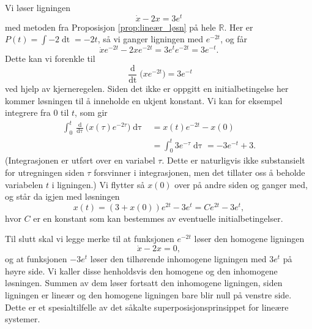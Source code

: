 \documentclass{article}
\theoremstyle{plain}
\theoremstyle{definition}
\theoremstyle{remark}
\newenvironment{ex}
{\pushQED{\qed}\renewcommand{\qedsymbol}{$\triangle$}\exx}
{\popQED\endexx}
\newcommand{\diff}[1]{\mathop{d#1}}
\newcommand{\fcn}{x}
\newcommand{\expfcn}[1]{e^{#1}}
\newcommand{\bigparanth}[1]{\big(#1\big)}
\begin{document}
\begin{ex} \label{eks:grundig_lineær}
    Vi løser ligningen
    \begin{equation*}
        \dot{\fcn} - 2\fcn = 3\expfcn{t}
    \end{equation*}
    med metoden fra Proposisjon \ref{prop:lineær_løsn} på hele $\mathbb{R}$. Her er $P(t) = \int -2 \diff{t} = -2t$, så vi ganger ligningen med $\expfcn{-2t}$, og får
    \begin{equation*}
        \dot{\fcn} \expfcn{-2t} - 2\fcn \expfcn{-2t} = 3\expfcn{t} \expfcn{-2t} = 3 \expfcn{-t}.
    \end{equation*}
    Dette kan vi forenkle til
    \begin{equation*}
        \frac{\diff{}}{\diff{t}} \bigparanth{\fcn \expfcn{-2t}} = 3 \expfcn{-t}
    \end{equation*}
    ved hjelp av kjerneregelen. Siden det ikke er oppgitt en initialbetingelse her kommer løsningen til å inneholde en ukjent konstant. Vi kan for eksempel integrere fra $0$ til $t$, som gir
    \begin{equation*}
        \begin{aligned}
            \int_0^t \frac{\diff{}}{\diff{\tau}} \bigparanth{\fcn(\tau) \expfcn{-2\tau}} \diff{\tau} & = \fcn(t)\expfcn{-2t} - \fcn(0)                             \\
                                                                                                     & = \int_0^t 3\expfcn{-\tau} \diff{\tau} = -3\expfcn{-t} + 3.
        \end{aligned}
    \end{equation*}
    (Integrasjonen er utført over en variabel $\tau$. Dette er naturligvis ikke substansielt for utregningen siden $\tau$ forsvinner i integrasjonen, men det tillater oss å beholde variabelen $t$ i ligningen.) Vi flytter så $x(0)$ over på andre siden og ganger med, og står da igjen med løsningen
    \begin{equation*}
        \fcn(t) = (3+\fcn(0)) \expfcn{2t} - 3\expfcn{t} = C \expfcn{2t} - 3\expfcn{t},
    \end{equation*}
    hvor $C$ er en konstant som kan bestemmes av eventuelle initialbetingelser.

    Til slutt skal vi legge merke til at funksjonen $\expfcn{-2t}$ løser den homogene ligningen
    \begin{equation*}
        \dot{\fcn} - 2\fcn = 0,
    \end{equation*}
    og at funksjonen $-3\expfcn{t}$ løser den tilhørende inhomogene ligningen med $3\expfcn{t}$ på høyre side. Vi kaller disse henholdsvis den homogene og den inhomogene løsningen. Summen av dem løser fortsatt den inhomogene ligningen, siden ligningen er lineær og den homogene ligningen bare blir null på venstre side. Dette er et spesialtilfelle av det såkalte superposisjonsprinsippet for lineære systemer.
\end{ex}
\end{document}
